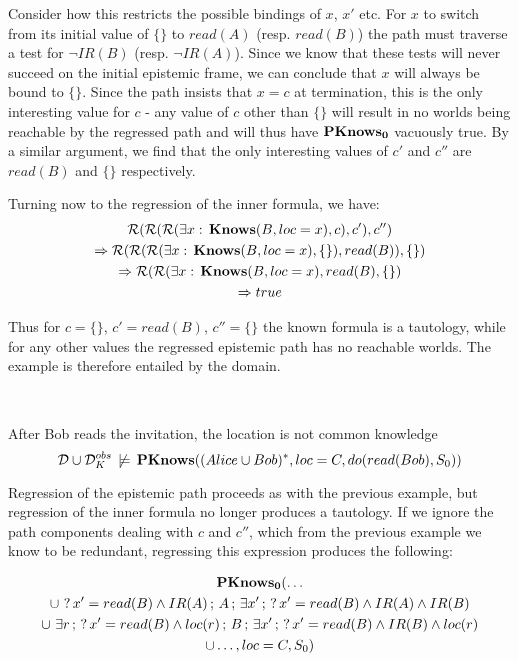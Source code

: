 Consider how this restricts the possible bindings of $x$, $x'$ etc.
For $x$ to switch from its initial value of $\{\}$ to $read(A)$
(resp. $read(B)$) the path must traverse a test for $\neg IR(B)$
(resp. $\neg IR(A)$). Since we know that these tests will never succeed
on the initial epistemic frame, we can conclude that $x$ will always
be bound to $\{\}$. Since the path insists that $x=c$ at termination,
this is the only interesting value for $c$ - any value of $c$ other
than $\{\}$ will result in no worlds being reachable by the regressed
path and will thus have $\mathbf{PKnows_{0}}$ vacuously true. By a similar argument,
we find that the only interesting values of $c'$ and $c''$ are $read(B)$
and $\{\}$ respectively.

Turning now to the regression of the inner formula, we have:\begin{gather*}
\mathcal{R}(\mathcal{R}(\mathcal{R}(\exists x:\,\mathbf{Knows}(B,loc=x),c),c'),c'')\\
\Rightarrow\mathcal{R}(\mathcal{R}(\mathcal{R}(\exists x:\,\mathbf{Knows}(B,loc=x),\{\}),read(B)),\{\})\\
\Rightarrow\mathcal{R}(\mathcal{R}(\exists x:\,\mathbf{Knows}(B,loc=x),read(B),\{\})\\
\Rightarrow true\end{gather*}


Thus for $c=\{\}$, $c'=read(B)$, $c''=\{\}$ the known formula is
a tautology, while for any other values the regressed epistemic path
has no reachable worlds. The example is therefore entailed by the
domain.

~

\begin{example}
After Bob reads the invitation, the location is not common knowledge\[
\mathcal{D}\cup\mathcal{D}_{K}^{obs}\,\not\models\,\mathbf{PKnows}((Alice\cup Bob)^{*},loc=C,do(read(Bob),S_{0}))\]

\end{example}
Regression of the epistemic path proceeds as with the previous example,
but regression of the inner formula no longer produces a tautology.
If we ignore the path components dealing with $c$ and $c''$, which
from the previous example we know to be redundant, regressing this
expression produces the following:

\begin{multline*}
\mathbf{PKnows_{0}}(\dots\\
\cup\,\,?\, x'=read(B)\wedge IR(A)\,;\, A\,;\,\exists x'\,;\,?\, x'=read(B)\wedge IR(A)\wedge IR(B)\\
\cup\,\,\exists r\,;\,?\, x'=read(B)\wedge loc(r)\,;\, B\,;\,\exists x'\,;\,?\, x'=read(B)\wedge IR(B)\wedge loc(r)\\
\cup\dots,loc=C,S_{0})\end{multline*}


